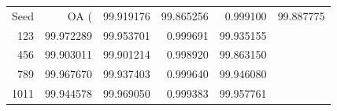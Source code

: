 \begin{tabular}{rrrrr}
\toprule
Seed & OA (%
 & 99.919176 & 99.865256 & 0.999100 & 99.887775 \\
123 & 99.972289 & 99.953701 & 0.999691 & 99.935155 \\
456 & 99.903011 & 99.901214 & 0.998920 & 99.863150 \\
789 & 99.967670 & 99.937403 & 0.999640 & 99.946080 \\
1011 & 99.944578 & 99.969050 & 0.999383 & 99.957761 \\
\bottomrule
\end{tabular}
